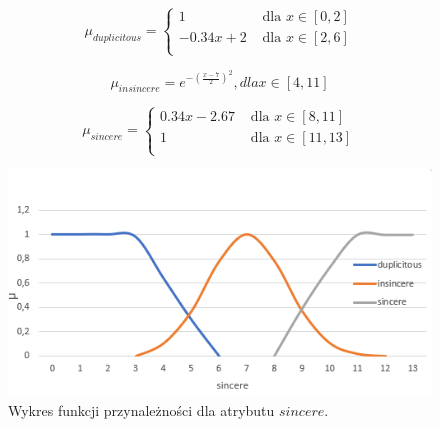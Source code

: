 \documentclass{classrep}
\begin{document}
\begin{enumerate}
  \begin{equation}
    \mu_{duplicitous} =
      \begin{cases}
        1 & \text{ dla } x \in [0,2] \\
        -0.34x+2 & \text{ dla } x \in [2,6] \\
      \end{cases}  
  \end{equation}

  \begin{equation}
    \mu_{insincere} =  e^{-(\frac{x-7}{2})^2}, dla x \in [4,11]
  \end{equation}

  \begin{equation}
    \mu_{sincere} =
      \begin{cases}
        0.34x-2.67 & \text{ dla } x \in [8,11] \\
        1 & \text{ dla } x \in [11,13] \\
      \end{cases}  
  \end{equation}

  
  \begin{figure}[H]
    \includegraphics{fp_sv2.png}
    \caption{Wykres funkcji przynależności dla atrybutu \(sincere\).}
    \end{figure}

\end{enumerate}


\end{document}
